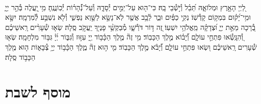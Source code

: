 \documentclass[twoside, openany, parskip=half, 11pt]{book}
\begin{document}
\begin{sometimes}

\\
%
לַ֭יְיָ הָאָ֣רֶץ וּמְלוֹאָ֑הּ תֵּ֝בֵ֗ל וְ֯י֣שְׁ֯בֵי בָֽהּ׃
כִּי־ה֖וּא עַל־יַמִּ֣ים יְ֯סָדָ֑הּ וְ֯עַל־נְ֝֯הָר֗וֹת יְ֯כֽוֹנֲנֶֽהָ׃
מִ֥י ֖יַֽעֲלֶה בְּ֯הַ֣ר יְיָ֑ וּמִ֥י־יָ֝ק֗וּם בִּמְק֥וֹם קָדְ֯שֽׁוֹ׃
נְקִ֥י כַפַּ֗יִם וּבַ֢ר לֵ֫בָ֥ב אֲשֶׁ֤ר לֹֽא־נָשָׂ֣א לַשָּׁ֣וְא נַפְשִׁ֑י וְ֯לֹ֖א נִשְׁבַּ֣ע לְ֯מִרְמָֽה׃
יִשָּׂ֣א בְ֭֯רָכָה מֵאֵ֣ת יְיָ֑ וּ֝צְדָקָ֗ה מֵֽאֱלֹהֵ֥י יִשְׁעֽוֹ׃
זֶ֭ה דּ֣וֹר דֹּרְ֯שָׁ֑ו מְ֯בַקְשֵׁ֥֨י פָנֶי֖ךָ יַֽעֲקֹ֣ב סֶֽלָה׃
שְׂא֤וּ שְׁ֯עָרִ֨ים רָֽאשֵׁיכֶ֗ם וְ֭֯הִנָּֽשְׂ֯אוּ פִּתְחֵ֣י עוֹלָ֑ם וְ֝֯יָב֗וֹא מֶ֣לֶךְ הַכָּבֽוֹד׃
מִ֥י זֶה֘ מֶ֤לֶךְ הַכָּ֫ב֥וֹד יְ֖יָ עִזּ֣וּז וְ֯גִבּ֑וֹר יְ֜יָ֗ גִּבּ֥וֹר מִלְחָמָֽה׃
שְׂא֤וּ שְׁ֯עָרִים רָֽאשֵׁיכֶ֗ם וּ֭שְׂאוּ פִּתְחֵ֣י עוֹלָ֑ם וְ֝֯יָבֹ֗א מֶ֣לֶךְ הַכָּבֽוֹד׃
מִ֤י ה֣וּא זֶה֘ מֶ֢לֶךְ הַכָּ֫ב֥וֹד יְיָ֥ צְ֯בָא֑וֹת ה֤וּא מֶ֖לֶךְ הַכָּב֣וֹד סֶֽלָה׃

\end{sometimes}



\etzchaim

\halfkaddish


\vspace{\baselineskip}


{\let\clearpage\relax
\chapter[מוסף לשבת]{ מוסף לשבת }}

\amidaopening{\shabbosshuva}{}

\end{document}
